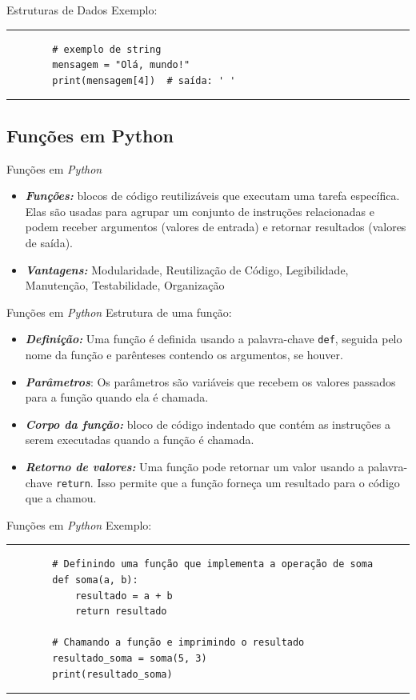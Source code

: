 \documentclass{beamer}
\begin{document}
\begin{frame}[fragile]{Estruturas de Dados}
	Exemplo:
	\rule{\textwidth}{1pt}
	\scriptsize
	\begin{verbatim}
		# exemplo de string
		mensagem = "Olá, mundo!"
		print(mensagem[4])  # saída: ' '
	\end{verbatim}
	\rule{\textwidth}{1pt}
\end{frame}

\subsection{Funções em Python}
\begin{frame}{Funções em \textit{Python}}
	\begin{itemize}
		\item \textbf{\textit{Funções:}} blocos de código reutilizáveis que executam uma tarefa específica. Elas são usadas para agrupar um conjunto de instruções relacionadas e podem receber argumentos (valores de entrada) e retornar resultados (valores de saída).
		\item \textbf{\textit{Vantagens:}} Modularidade, Reutilização de Código, Legibilidade, Manutenção, Testabilidade, Organização
	\end{itemize}
\end{frame}

\begin{frame}{Funções em \textit{Python}}
	Estrutura de uma função:
	\begin{itemize}
		\item \textbf{\textit{Definição:}} Uma função é definida usando a palavra-chave \texttt{def}, seguida pelo nome da função e parênteses contendo os argumentos, se houver.
		\item \textbf{\textit{Parâmetros}}: Os parâmetros são variáveis que recebem os valores passados para a função quando ela é chamada. 
		\item \textbf{\textit{Corpo da função:}} bloco de código indentado que contém as instruções a serem executadas quando a função é chamada. 
		\item \textbf{\textit{Retorno de valores:}} Uma função pode retornar um valor usando a palavra-chave \texttt{return}. Isso permite que a função forneça um resultado para o código que a chamou.
	\end{itemize}
\end{frame}


\begin{frame}[fragile]{Funções em \textit{Python}}
	Exemplo:
	\rule{\textwidth}{1pt}
	\scriptsize
	\begin{verbatim}
		# Definindo uma função que implementa a operação de soma
		def soma(a, b):
			resultado = a + b
			return resultado
		
		# Chamando a função e imprimindo o resultado
		resultado_soma = soma(5, 3)
		print(resultado_soma)
			\end{verbatim}
	\rule{\textwidth}{1pt}
\end{frame}
\end{document}
